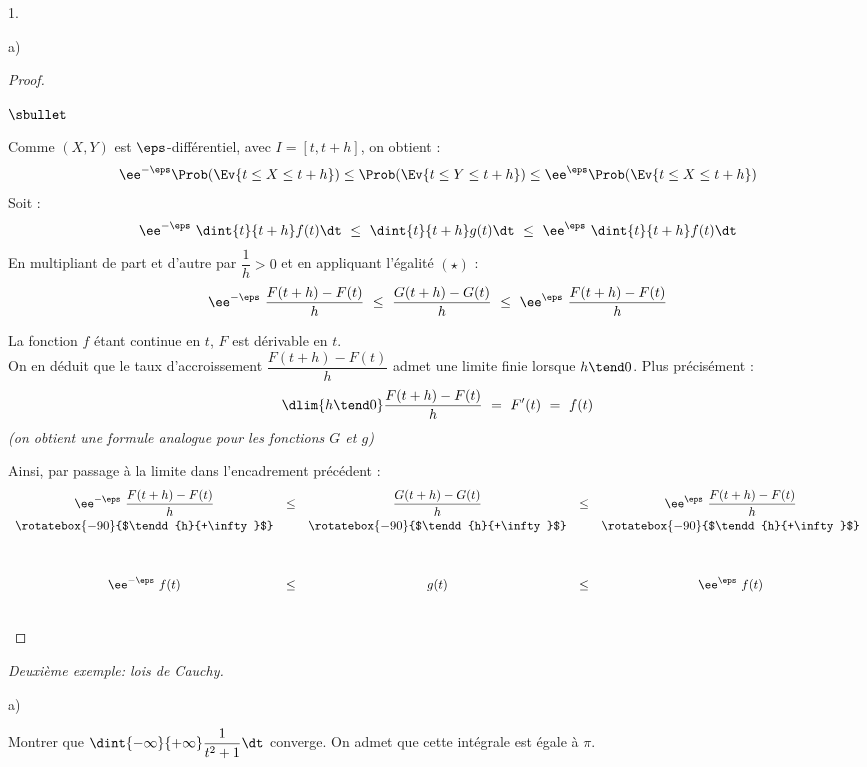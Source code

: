 \documentclass[11pt]{article}%
\begin{document}
\begin{noliste}{1.}
\begin{noliste}{a)}
\begin{proof}
\begin{noliste}{$\sbullet$}
      \item Comme $(X,Y)$ est $\eps$-différentiel, avec $I =
        [t, t+h]$, on obtient :
        \[
          \ee^{-\eps} \Prob(\Ev{t \leq X \leq t+h}) \leq 
          \Prob(\Ev{t \leq Y \leq t+h}) \leq \ee^{\eps} 
          \Prob(\Ev{t \leq X \leq t+h})
        \]
        Soit :
        \[
        \ee^{-\eps} \ \dint{t}{t+h} f(t) \dt \ \leq \ \dint{t}{t+h} g(t)
        \dt \ \leq \ \ee^{\eps} \ \dint{t}{t+h} f(t) \dt
        \]
        En multipliant de part et d'autre par $\dfrac{1}{h} > 0$ et en
        appliquant l'égalité $(\star)$ : 
        \[
        \ee^{-\eps} \ \dfrac{F(t+h) - F(t)}{h} \ \leq \ \dfrac{G(t+h)
          - G(t)}{h} \ \leq \ \ee^{\eps} \ \dfrac{F(t+h) - F(t)}{h}
        \]

      \item La fonction $f$ étant continue en $t$, $F$ est
        dérivable en $t$.\\[.1cm]
        On en déduit que le taux d'accroissement $\dfrac{F(t+h) -
          F(t)}{h}$ admet une limite finie lorsque $h \tend 0$. Plus
        précisément :
        \[
        \dlim{h \tend 0} \dfrac{F(t+h) - F(t)}{h} \ = \ F'(t) \ = \
        f(t)
        \]
        {\it (on obtient une formule analogue pour les fonctions $G$
          et $g$)}
          
          
          
          
        Ainsi, par passage à la limite dans l'encadrement précédent :
        \[
        \begin{array}{ccccc}
          \ee^{-\eps} \ \dfrac{F(t+h) - F(t)}{h} & \leq & \dfrac{G(t+h)
            - G(t)}{h} & \leq & \ee^{\eps} \ \dfrac{F(t+h) - F(t)}{h}
          \\[.2cm]
          \rotatebox{-90}{$\tendd{h}{+\infty}$} & &
          \rotatebox{-90}{$\tendd{h}{+\infty}$} & &
          \rotatebox{-90}{$\tendd{h}{+\infty}$} 
          \\[1.2cm]
          \ee^{-\eps} \ f(t) & \leq & g(t) & \leq & \ee^{\eps} \ f(t)
        \end{array}
        \]        
      \end{noliste}
      ~\\[-1.2cm]
    \end{proof}

  \end{noliste}
  
\item {\em Deuxième exemple: lois de Cauchy.}
  \begin{noliste}{a)}
    \setlength{\itemsep}{2mm} %
  \item Montrer que $\dint{-\infty}{+\infty} \dfrac{1}{t^2+1} \dt$
    converge. On admet que cette intégrale est égale à $\pi$.


\end{noliste}
\end{noliste}
\end{document}

